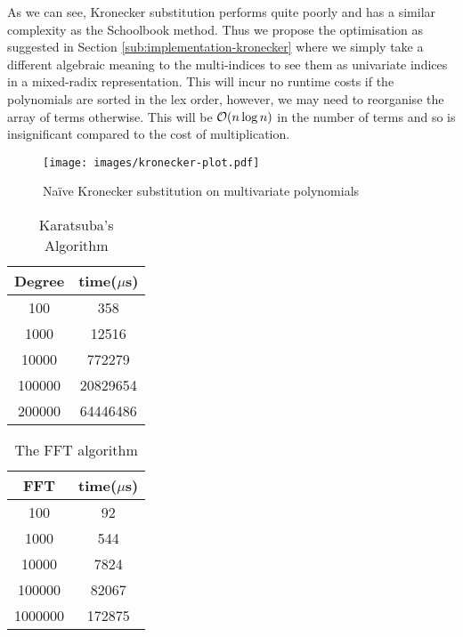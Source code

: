 As we can see, Kronecker substitution performs quite poorly and has a similar complexity as the Schoolbook method. Thus we propose the optimisation as suggested in Section \ref{sub:implementation-kronecker} where we simply take a different algebraic meaning to the multi-indices to see them as univariate indices in a mixed-radix representation. This will incur no runtime costs if the polynomials are sorted in the lex order, however, we may need to reorganise the array of terms otherwise. This will be $\mathcal O(n \log n)$ in the number of terms and so is insignificant compared to the cost of multiplication.

\begin{figure}[t]
    \centering
    \texttt{[image: images/kronecker-plot.pdf]}
    \caption{Na\"{i}ve Kronecker substitution on multivariate polynomials}
    \label{fig:kronecker}
\end{figure}


\begin{table}[h]
\centering
    \begin{tabular}{|c| c |}
        \hline
        Degree & time($\mu$s)\\
        \hline
        100 & 358\\
        1000 & 12516\\
        10000 & 772279\\
        100000 & 20829654\\
        200000 & 64446486\\
        \hline
    \end{tabular}
    \caption{Karatsuba's Algorithm}
\end{table}

\begin{table}[h]
\centering
    \begin{tabular}{|c| c |}
        \hline
        FFT & time($\mu$s)\\
        \hline
        100 & 92\\
        1000 & 544\\
        10000 & 7824\\
        100000 & 82067\\
        1000000 & 172875\\
        \hline
    \end{tabular}
    \caption{The FFT algorithm}
\end{table}

